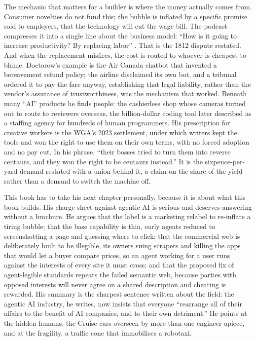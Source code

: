 The mechanic that matters for a builder is where the money actually comes from. Consumer novelties do not fund this; the bubble is inflated by a specific promise sold to employers, that the technology will cut the wage bill. The podcast compresses it into a single line about the business model: ``How is it going to increase productivity? By replacing labor'' \parencite{LynskeyDunt2026Luddites}. That is the 1812 dispute restated. And when the replacement misfires, the cost is routed to whoever is cheapest to blame. Doctorow's example is the Air Canada chatbot that invented a bereavement refund policy; the airline disclaimed its own bot, and a tribunal ordered it to pay the fare anyway, establishing that legal liability, rather than the vendor's assurance of trustworthiness, was the mechanism that worked. Beneath many ``AI'' products he finds people: the cashierless shop whose cameras turned out to route to reviewers overseas, the billion-dollar coding tool later described as a staffing agency for hundreds of human programmers. His prescription for creative workers is the WGA's 2023 settlement, under which writers kept the tools and won the right to use them on their own terms, with no forced adoption and no pay cut. In his phrase, ``their bosses tried to turn them into reverse centaurs, and they won the right to be centaurs instead.'' It is the sixpence-per-yard demand restated with a union behind it, a claim on the share of the yield rather than a demand to switch the machine off.

This book has to take his next chapter personally, because it is about what this book builds. His charge sheet against agentic AI is serious and deserves answering without a brochure. He argues that the label is a marketing relabel to re-inflate a tiring bubble; that the base capability is thin, early agents reduced to screenshotting a page and guessing where to click; that the commercial web is deliberately built to be illegible, its owners suing scrapers and killing the apps that would let a buyer compare prices, so an agent working for a user runs against the interests of every site it must cross; and that the proposed fix of agent-legible standards repeats the failed semantic web, because parties with opposed interests will never agree on a shared description and cheating is rewarded. His summary is the sharpest sentence written about the field: the agentic AI industry, he writes, now insists that everyone ``rearrange all of their affairs to the benefit of AI companies, and to their own detriment.'' He points at the hidden humans, the Cruise cars overseen by more than one engineer apiece, and at the fragility, a traffic cone that immobilises a robotaxi.

